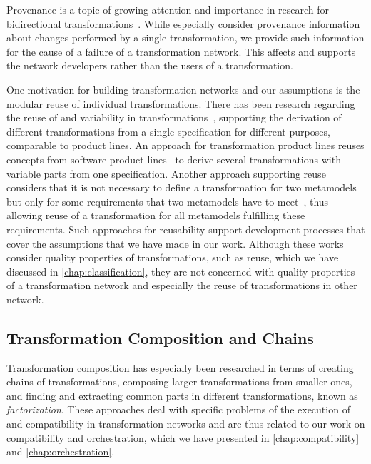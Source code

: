 Provenance is a topic of growing attention and importance in research for bidirectional transformations~\cite{cleve2019dagstuhl,anjorin2019provenance-tapp}.
While \textcite{anjorin2019provenance-tapp} especially consider provenance information about changes performed by a single transformation, we provide such information for the cause of a failure of a transformation network.
This affects and supports the network developers rather than the users of a transformation.

One motivation for building transformation networks and our assumptions is the modular reuse of individual transformations.
There has been research regarding the reuse of and variability in transformations~\cite{bruel2020transformationReuse-SoSym}, supporting the derivation of different transformations from a single specification for different purposes, comparable to product lines.
An approach for transformation product lines reuses concepts from software product lines~\cite{delara2018transformationProductLines-Models} to derive several transformations with variable parts from one specification.
Another approach supporting reuse considers that it is not necessary to define a transformation for two metamodels but only for some requirements that two metamodels have to meet~\cite{delara2019transformationResue-TOSEM}, thus allowing reuse of a transformation for all metamodels fulfilling these requirements.
Such approaches for reusability support development processes that cover the assumptions that we have made in our work.
Although these works consider quality properties of transformations, such as reuse, which we have discussed in \autoref{chap:classification}, they are not concerned with quality properties of a transformation network and especially the reuse of transformations in other network.


\subsection{Transformation Composition and Chains}

Transformation composition has especially been researched in terms of creating chains of transformations, composing larger transformations from smaller ones, and finding and extracting common parts in different transformations, known as \emph{factorization}.
These approaches deal with specific problems of the execution of and compatibility in transformation networks and are thus related to our work on compatibility and orchestration, which we have presented in \autoref{chap:compatibility} and \autoref{chap:orchestration}.

